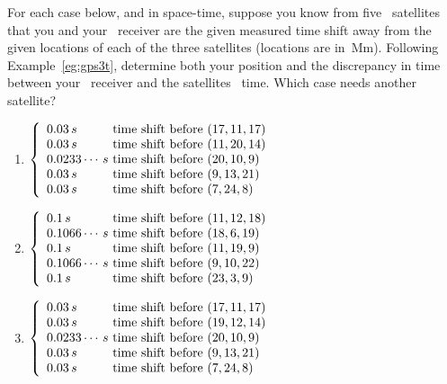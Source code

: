 \begin{comment}
Possibly polynomial\slash multivariate curve fitting (exact)  \larsvii{p.25--8} as example of data mining, and scientific and engineering inference? e.g.~discovering `index' combinations.
Applications involving homogeneous systems, such as balance chemical reactions, leave for the next section.
Nakos~\S1.4 has lots of good ideas (including derivation of cosine rule for triangles).
\end{comment}





\begin{exercise} \label{ex:gps3t} 
For each case below, and in space-time, suppose you know from five \gps\ satellites that you and your \gps\ receiver are the given measured time shift away from the given locations of each of the three satellites (locations are in~Mm).  
Following Example~\ref{eg:gps3t}, determine both your position and the discrepancy in time between your \gps\ receiver and the satellites \gps\ time.  
Which case needs another satellite?
\begin{enumerate}
\item  
\(\left\{\begin{array}{l@{\text{ time shift before }}l}
0.03\,s&(17,11,17)\\
0.03\,s&(11,20,14)\\
0.0233\cdots\,s&(20,10,9)\\
0.03\,s&(9,13,21)\\
0.03\,s&(7,24,8)
\end{array}\right.\)

\item 
\(\left\{\begin{array}{l@{\text{ time shift before }}l}
0.1\,s&(11,12,18)\\
0.1066\cdots\,s&(18,6,19)\\
0.1\,s&(11,19,9)\\
0.1066\cdots\,s&(9,10,22)\\
0.1\,s&(23,3,9)
\end{array}\right.\)

\item 
\(\left\{\begin{array}{l@{\text{ time shift before }}l}
0.03\,s&(17,11,17)\\
0.03\,s&(19,12,14)\\
0.0233\cdots\,s&(20,10,9)\\
0.03\,s&(9,13,21)\\
0.03\,s&(7,24,8)
\end{array}\right.\)

\end{enumerate}
\end{exercise}





